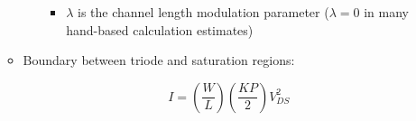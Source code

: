 \begin{itemize}
\begin{itemize}
\begin{itemize}
\begin{itemize}
              \item $\lambda$ is the channel length modulation parameter ($\lambda=0$ in many hand-based calculation estimates)

            \end{itemize}

        \end{itemize}

      \item Boundary between triode and saturation regions:

        $$I=\left( \frac{W}{L} \right)\left( \frac{KP}{2} \right)V_{DS}^2$$

    \end{itemize}

\end{itemize}




